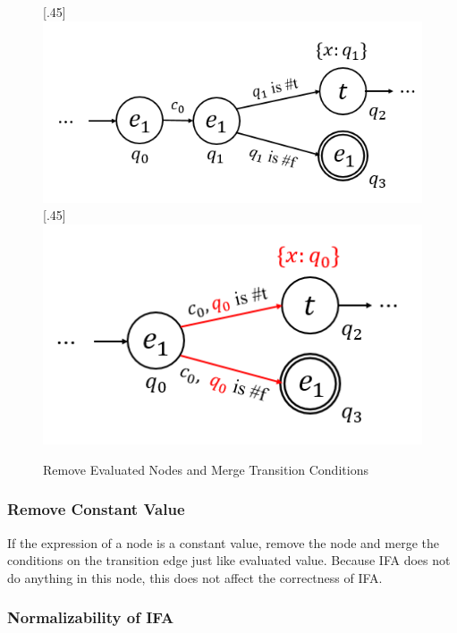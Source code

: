 \begin{figure}[t]
\centering
{}[.45\linewidth]{
    \includegraphics[scale=0.25]{images/nmlifa/nmlifa-merge-1.png}
}
[.45\linewidth]{
    \includegraphics[scale=0.25]{images/nmlifa/nmlifa-merge-2.png}
}
\caption{Remove Evaluated Nodes and Merge Transition Conditions}
\label{fig:nmlifa-merge}
\end{figure}

\subsubsection{Remove Constant Value}

If the expression of a node is a constant value, remove the node and merge the conditions on the transition edge just like evaluated value. Because IFA does not do anything in this node, this does not affect the correctness of IFA.

\subsubsection{Normalizability of IFA}

